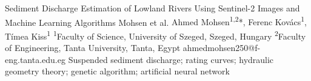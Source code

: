 \abstract
{Sediment Discharge Estimation of Lowland Rivers Using Sentinel-2 Images and Machine Learning Algorithms} 
{Mohsen et al.} 
{Ahmed Mohsen\textsuperscript{1,2}*, Ferenc Kovács\textsuperscript{1}, Tímea Kiss\textsuperscript{1}} 
{\TLtag} 
{
\textsuperscript{1}Faculty of Science, University of Szeged, Szeged, Hungary 
\textsuperscript{2}Faculty of Engineering, Tanta University, Tanta, Egypt
}
{ahmed\textunderscore mohsen250@f-eng.tanta.edu.eg}  %
{Suspended sediment discharge; rating curves; hydraulic geometry theory; genetic algorithm; artificial neural network}
